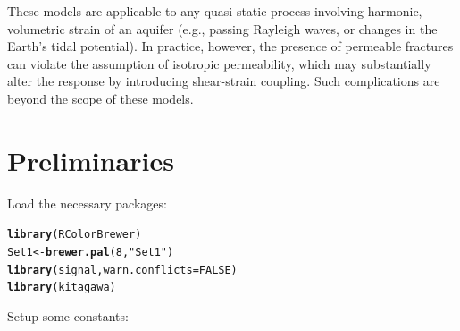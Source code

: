 \documentclass[12pt]{article}\usepackage[]{graphicx}\usepackage[]{color}
\makeatletter
\newcommand{\hlnum}[1]{\textcolor[rgb]{0.686,0.059,0.569}{#1}}%
\newcommand{\hlstr}[1]{\textcolor[rgb]{0.192,0.494,0.8}{#1}}%
\newcommand{\hlstd}[1]{\textcolor[rgb]{0.345,0.345,0.345}{#1}}%
\newcommand{\hlkwb}[1]{\textcolor[rgb]{0.69,0.353,0.396}{#1}}%
\newcommand{\hlkwc}[1]{\textcolor[rgb]{0.333,0.667,0.333}{#1}}%
\newcommand{\hlkwd}[1]{\textcolor[rgb]{0.737,0.353,0.396}{\textbf{#1}}}%
\newenvironment{kframe}{%
 \def\at@end@of@kframe{}%
 \ifinner\ifhmode%
  \def\at@end@of@kframe{\end{minipage}}%
  \begin{minipage}{\columnwidth}%
 \fi\fi%
 \def\FrameCommand##1{\hskip\@totalleftmargin \hskip-\fboxsep
 \colorbox{shadecolor}{##1}\hskip-\fboxsep
     \hskip-\linewidth \hskip-\@totalleftmargin \hskip\columnwidth}%
 \MakeFramed {\advance\hsize-\width
   \@totalleftmargin\z@ \linewidth\hsize
   \@setminipage}}%
 {\par\unskip\endMakeFramed%
 \at@end@of@kframe}
\newenvironment{knitrout}{}{} %
\makeatother
\begin{document}
 These models are applicable to any quasi-static process involving harmonic, 
 volumetric strain of an aquifer 
 (e.g., passing Rayleigh waves, or changes in the Earth's tidal potential). 
 In practice, however, the presence of permeable fractures can violate the
 assumption of isotropic permeability, which may substantially
 alter the response by introducing shear-strain coupling. Such
 complications are beyond the scope of these models.

\section{Preliminaries}



Load the necessary packages:

\begin{knitrout}\small
{}\color{fgcolor}\begin{kframe}
\begin{alltt}
\hlkwd{library}\hlstd{(RColorBrewer)}
\hlstd{Set1} \hlkwb{<-} \hlkwd{brewer.pal}\hlstd{(}\hlnum{8}\hlstd{,} \hlstr{"Set1"}\hlstd{)}
\hlkwd{library}\hlstd{(signal,} \hlkwc{warn.conflicts} \hlstd{=} \hlnum{FALSE}\hlstd{)}
\hlkwd{library}\hlstd{(kitagawa)}
\end{alltt}


{\ttfamily\noindent\itshape\color{messagecolor}{\#\# Loaded kitagawa (2.3) -- Spectral response of water wells}}\end{kframe}
\end{knitrout}

Setup some constants:
\end{document}
